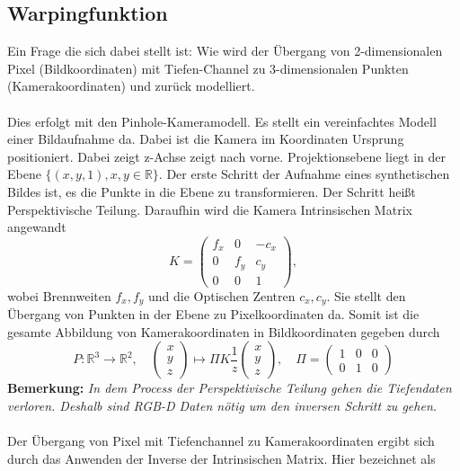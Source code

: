 \documentclass[12pt,DIV=15,BCOR=15mm,twoside,headsepline,abstract=true,listof=totoc,bibliography=totoc]{scrreprt}
\theoremstyle{remark}    %
\begin{document}
    \subsection{Warpingfunktion}
    Ein Frage die sich dabei stellt ist: Wie wird der Übergang von 2-dimensionalen Pixel (Bildkoordinaten) mit Tiefen-Channel zu 3-dimensionalen Punkten 
    (Kamerakoordinaten) und zurück modelliert.\\\\
    Dies erfolgt mit den Pinhole-Kameramodell. Es stellt ein vereinfachtes Modell einer Bildaufnahme da. Dabei ist die Kamera im Koordinaten
    Ursprung positioniert. Dabei zeigt z-Achse zeigt nach vorne. Projektionsebene liegt in der Ebene 
    $\{(x,y,1), x,y \in \mathbb{R}\}$. Der erste Schritt der Aufnahme eines synthetischen Bildes ist, es die Punkte in die Ebene zu transformieren. Der
    Schritt heißt Perspektivische Teilung.
    Daraufhin wird die Kamera Intrinsischen Matrix angewandt 
    \[
    K =  \begin{pmatrix}
        f_x & 0 & -c_x \\[6pt]
        0 & f_y & c_y \\[6pt]
        0 & 0 & 1
        \end{pmatrix},
    \]    
    wobei Brennweiten $f_x, f_y$ und die Optischen Zentren $c_x, c_y$. Sie stellt den Übergang von Punkten in der Ebene zu Pixelkoordinaten da.
    Somit ist die gesamte Abbildung von Kamerakoordinaten in Bildkoordinaten gegeben durch \cite{djema2023densevisualodometryusing}
    \[  
       P: \mathbb{R}^3 \to \mathbb{R}^2, \hspace{1em} \begin{pmatrix} x\\y\\z \end{pmatrix} \mapsto \Pi K \frac{1}{z} \begin{pmatrix} x\\y\\z \end{pmatrix}
       , \hspace{1em} \Pi = \begin{pmatrix}1 & 0 & 0 \\ 0 & 1 & 0 \end{pmatrix}
    \]
    \textbf{Bemerkung:} \emph{In dem Process der Perspektivische Teilung gehen die Tiefendaten verloren. Deshalb sind RGB-D Daten nötig um den inversen 
    Schritt zu gehen.}\\\\
    Der Übergang von Pixel mit Tiefenchannel zu Kamerakoordinaten ergibt sich durch das Anwenden der Inverse der Intrinsischen Matrix. Hier bezeichnet als
\end{document}

